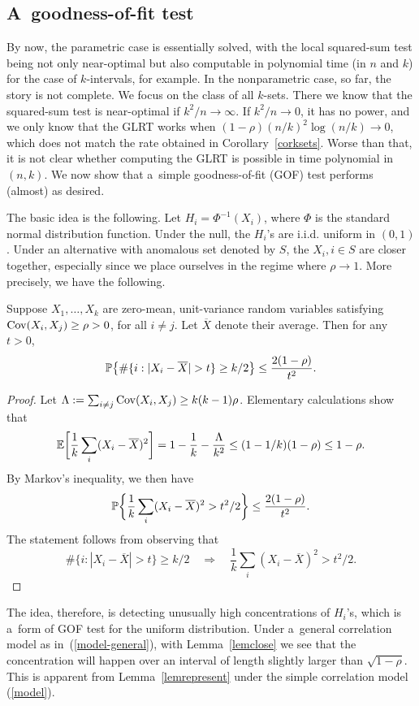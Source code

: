 \documentclass[10pt, oneside]{article}
\begin{document}
\subsection{A~goodness-of-fit test}

By now, the parametric case is essentially solved, with the local
squared-sum test being not only near-optimal but also computable in
polynomial time
(in $n$ and $k$)
for the case of $k$-intervals, for example. In the nonparametric case,
so far, the story is not complete. We focus on the class of all
$k$-sets. There we know that the squared-sum test is near-optimal if
$k^2/n \to\infty$. If $k^2/n \to0$, it has no power, and we only
know that the GLRT works when $(1-\rho) (n/k)^2 \log(n/k)\to0$,
which does not match the rate obtained in Corollary~\ref{corksets}.
Worse than that, it is not clear whether computing the GLRT is possible
in time polynomial in $(n, k)$.
We now show that a~simple
goodness-of-fit (GOF)
test performs (almost) as desired.

The basic idea is the following.
Let $H_i = \Phi^{-1}(X_i)$, where $\Phi$ is the standard normal distribution
function. Under the null, the $H_i$'s are i.i.d. uniform in $(0,1)$.
Under an alternative with anomalous set denoted by $S$, the $X_i, i
\in S$ are closer together, especially since we place ourselves in the
regime where $\rho\to1$. More precisely, we have the following.
%
\begin{lem} \label{lemclose}
Suppose $X_1,\ldots, X_k$ are
zero-mean, unit-variance
random variables satisfying $\operatorname{Cov}(X_i, X_j) \geq\rho> 0$, for all $i
\neq j$. Let $\overline{X}$ denote their average. Then for any $t > 0$,
%
\[
\mathbb{P}\bigl\{ \# \{i: |X_i - \overline{X}| > t\} \geq k/2\bigr\}
\leq\frac{2(1-\rho)}{t^2}.
\]
%
\end{lem}
%
\begin{proof}
Let $\Lambda:= \sum_{i \neq j} \operatorname{Cov}(X_i, X_j) \geq k(k-1) \rho$.
Elementary calculations show that
%
\[
\mathbb{E}\biggl[\frac1k \sum_i (X_i - \overline{X})^2\biggr]
= 1 -\frac1k -\frac{\Lambda}{k^2} \leq(1 -1/k)(1 - \rho) \leq
1-\rho.
\]
%
By Markov's inequality, we then have
%
\[
\mathbb{P}\biggl\{ \frac1k \sum_i (X_i - \overline{X})^2 > t^2/2
\biggr\}
\leq\frac{2(1-\rho)}{t^2}.
\]
%
The statement follows from observing that
%
\[
\# \{i: |X_i - \overline{X}| > t\} \geq k/2  \quad\Rightarrow\quad
\frac1k \sum_i (X_i - \overline{X})^2 > t^2/2.
\]
%
\end{proof}

The idea, therefore, is detecting unusually high concentrations of
$H_i$'s, which is a~form of GOF test for the uniform distribution.
Under a~general correlation model as in~(\ref{model-general}), with
Lemma~\ref{lemclose} we see that the concentration will happen over an
interval of length slightly larger than $\sqrt{1-\rho}$. This is
apparent from Lemma~\ref{lemrepresent} under the simple correlation model
(\ref{model}).
\end{document}
